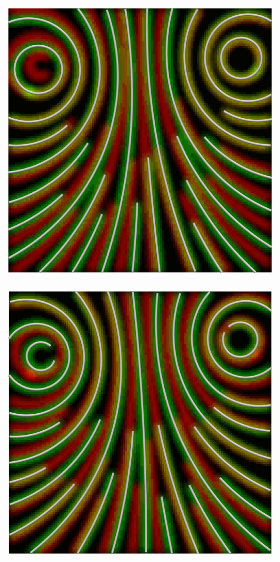 \begin{figure}[ht]
\begin{subfigure}{\textwidth}
\begin{subfigure}{.19\textwidth}
        \end{subfigure}
        \begin{subfigure}{.19\textwidth}
            \centering
            \includegraphics[scale=.055]{figures/AlphaStudy/GyroNC.0002.png}
        \end{subfigure}
        \begin{subfigure}{.19\textwidth}
            \centering
            \includegraphics[scale=.055]{figures/AlphaStudy/GyroNC.0003.png}

\end{subfigure}
\end{subfigure}
\end{figure}
